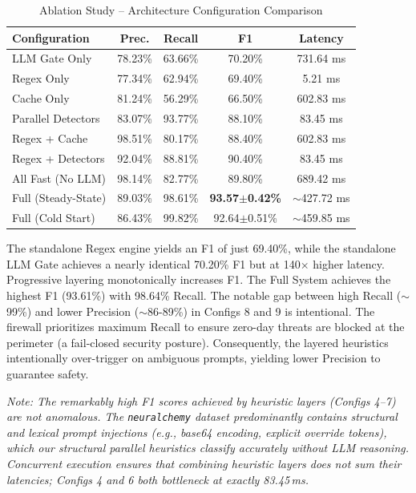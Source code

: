 \documentclass[conference]{IEEEtran}
\begin{document}
\begin{table}[htbp]
\caption{Ablation Study -- Architecture Configuration Comparison}
\label{tab:ablation}
\centering
\begin{tabular}{@{}lcccc@{}}
\toprule
\textbf{Configuration} & \textbf{Prec.} & \textbf{Recall} & \textbf{F1} & \textbf{Latency} \\
\midrule
LLM Gate Only & 78.23\% & 63.66\% & 70.20\% & 731.64 ms \\
Regex Only & 77.34\% & 62.94\% & 69.40\% & 5.21 ms \\
Cache Only & 81.24\% & 56.29\% & 66.50\% & 602.83 ms \\
Parallel Detectors & 83.07\% & 93.77\% & 88.10\% & 83.45 ms \\
Regex + Cache & 98.51\% & 80.17\% & 88.40\% & 602.83 ms \\
Regex + Detectors & 92.04\% & 88.81\% & 90.40\% & 83.45 ms \\
All Fast (No LLM) & 98.14\% & 82.77\% & 89.80\% & 689.42 ms \\
Full (Steady-State) & 89.03\% & 98.61\% & \textbf{93.57$\pm$0.42\%} & $\sim$427.72 ms \\
Full (Cold Start) & 86.43\% & 99.82\% & 92.64$\pm$0.51\% & $\sim$459.85 ms \\
\bottomrule
\end{tabular}
\end{table}

The standalone Regex engine yields an F1 of just 69.40\%, while the standalone LLM Gate achieves a nearly identical 70.20\% F1 but at 140$\times$ higher latency. Progressive layering monotonically increases F1. The Full System achieves the highest F1 (93.61\%) with 98.64\% Recall. The notable gap between high Recall ($\sim$99\%) and lower Precision ($\sim$86-89\%) in Configs 8 and 9 is intentional. The firewall prioritizes maximum Recall to ensure zero-day threats are blocked at the perimeter (a fail-closed security posture). Consequently, the layered heuristics intentionally over-trigger on ambiguous prompts, yielding lower Precision to guarantee safety.

\textit{Note: The remarkably high F1 scores achieved by heuristic layers (Configs 4--7) are not anomalous. The \texttt{neuralchemy} dataset predominantly contains structural and lexical prompt injections (e.g., base64 encoding, explicit override tokens), which our structural parallel heuristics classify accurately without LLM reasoning. Concurrent execution ensures that combining heuristic layers does not sum their latencies; Configs 4 and 6 both bottleneck at exactly 83.45\,ms.}
\end{document}
